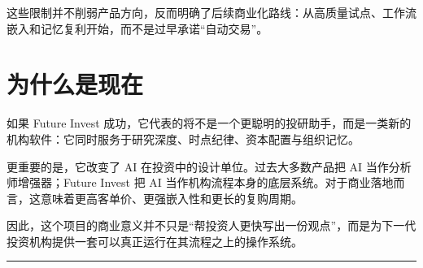 \documentclass[11pt]{article}
\begin{document}
这些限制并不削弱产品方向，反而明确了后续商业化路线：从高质量试点、工作流嵌入和记忆复利开始，而不是过早承诺“自动交易”。

\section{为什么是现在}

如果 Future Invest 成功，它代表的将不是一个更聪明的投研助手，而是一类新的机构软件：它同时服务于研究深度、时点纪律、资本配置与组织记忆。

更重要的是，它改变了 AI 在投资中的设计单位。过去大多数产品把 AI 当作分析师增强器；Future Invest 把 AI 当作机构流程本身的底层系统。对于商业落地而言，这意味着更高客单价、更强嵌入性和更长的复购周期。

因此，这个项目的商业意义并不只是“帮投资人更快写出一份观点”，而是为下一代投资机构提供一套可以真正运行在其流程之上的操作系统。

\vspace{1em}
\hrule
\vspace{0.6em}
\end{document}

